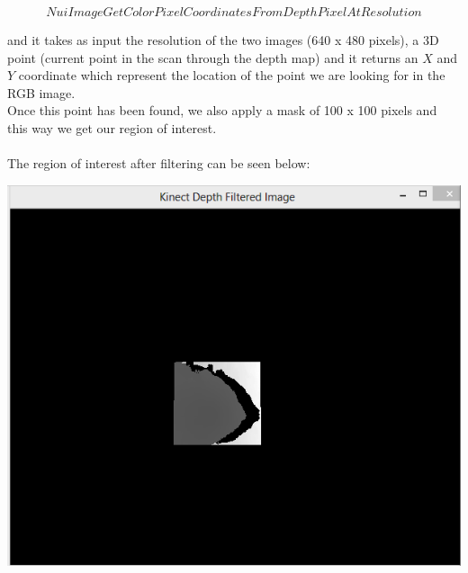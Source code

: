 $$ NuiImageGetColorPixelCoordinatesFromDepthPixelAtResolution $$

\noindent
and it takes as input the resolution of the two images (640 x 480 pixels), a 3D point (current point in the scan through the depth map) and it returns an $X$ and $Y$ coordinate which represent the location of the point we are looking for in the RGB image. 
\\
Once this point has been found, we also apply a mask of 100 x 100 pixels and this way we get our region of interest. 
\\\\
The region of interest after filtering can be seen below:

\begin{center}
	\includegraphics[scale=0.8]{images/depth_filtered_image.png}
	\label{fig:depth_filter}
\end{center}

